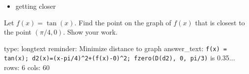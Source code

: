 \documentclass[12pt]{article}
\begin{document}
\begin{itemize}
\itemsep1pt\parskip0pt
\item
  getting closer
\end{itemize}

Let $f(x) = \tan(x)$. Find the point on the graph of $f(x)$ that is
closest to the point $(\pi/4, 0)$. Show your work.

\begin{answer}
type: longtext
reminder: Minimize distance to graph
answer_text: \verb#f(x) = tan(x); d2(x)=(x-pi/4)^2+(f(x)-0)^2; fzero(D(d2), 0, pi/3)# is 0.35... 
rows: 6
cols: 60
\end{answer}
\end{document}
